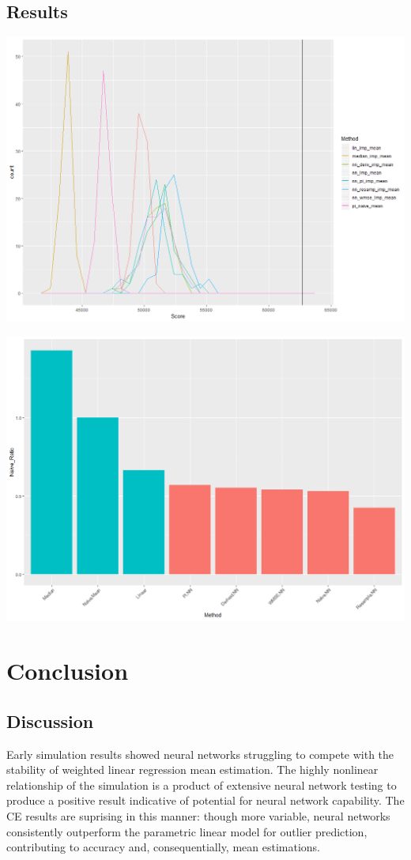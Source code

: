 \documentclass[12pt,twoside]{reedthesis}
\begin{document}
\section{Results}\label{results}

\includegraphics[width=0.8\linewidth]{figure/vline_fig}

\includegraphics[width=0.8\linewidth]{figure/clean_results_histogram}

\chapter{Conclusion}\label{conclusion}

\section{Discussion}\label{discussion}

Early simulation results showed neural networks struggling to compete
with the stability of weighted linear regression mean estimation. The
highly nonlinear relationship of the simulation is a product of
extensive neural network testing to produce a positive result indicative
of potential for neural network capability. The CE results are suprising
in this manner: though more variable, neural networks consistently
outperform the parametric linear model for outlier prediction,
contributing to accuracy and, consequentially, mean estimations.
\end{document}
